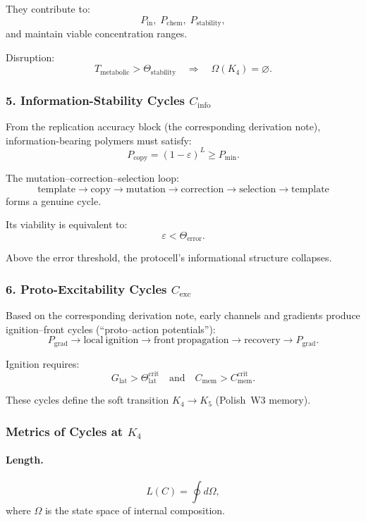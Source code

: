 They contribute to:
\[
  P_{\mathrm{in}},\; P_{\mathrm{chem}},\; P_{\mathrm{stability}},
\]
and maintain viable concentration ranges.

Disruption:
\[
  T_{\mathrm{metabolic}}>\Theta_{\mathrm{stability}}
\quad\Rightarrow\quad
  \Omega(K_4)=\varnothing.
\]

\subsubsection{5. Information-Stability Cycles $C_{\mathrm{info}}$}

From the replication accuracy block (the corresponding derivation note),
information-bearing polymers must satisfy:
\[
  P_{\mathrm{copy}}=(1-\varepsilon)^L \ge P_{\min}.
\]

The mutation–correction–selection loop:
\[
  \mathrm{template}
  \to \mathrm{copy}
  \to \mathrm{mutation}
  \to \mathrm{correction}
  \to \mathrm{selection}
  \to \mathrm{template}
\]
forms a genuine cycle.

Its viability is equivalent to:
\[
  \varepsilon < \Theta_{\mathrm{error}}.
\]

Above the error threshold, the protocell’s informational structure
collapses.

\subsubsection{6. Proto-Excitability Cycles $C_{\mathrm{exc}}$}

Based on the corresponding derivation note, early channels and gradients produce
ignition–front cycles (“proto–action potentials”):
\[
  P_{\mathrm{grad}} \to
  \mathrm{local\ ignition} \to
  \mathrm{front\ propagation} \to
  \mathrm{recovery} \to
  P_{\mathrm{grad}}.
\]

Ignition requires:
\[
  G_{\mathrm{lat}} > \Theta^{\mathrm{crit}}_{\mathrm{lat}}
\quad\text{and}\quad
  C_{\mathrm{mem}}>C_{\mathrm{mem}}^{\mathrm{crit}}.
\]

These cycles define the soft transition $K_4\to K_5$
(Polish~W3 memory).

\subsubsection{Metrics of Cycles at \texorpdfstring{$K_4$}{K_4}}

\paragraph{Length.}
\[
  L(C)=\oint d\Omega,
\]
where $\Omega$ is the state space of internal composition.

